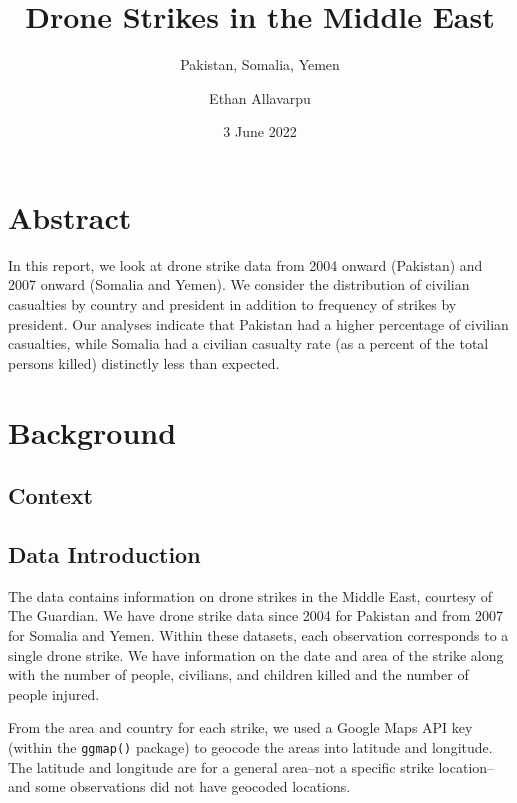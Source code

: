 \documentclass[
]{article}
\title{Drone Strikes in the Middle East}
\subtitle{Pakistan, Somalia, Yemen}
\author{Ethan Allavarpu}
\date{3 June 2022}
\begin{document}
\maketitle

{
\setcounter{tocdepth}{1}
\tableofcontents
}
\vfill

\hypertarget{abstract}{%
\section{Abstract}\label{abstract}}

In this report, we look at drone strike data from 2004 onward (Pakistan)
and 2007 onward (Somalia and Yemen). We consider the distribution of
civilian casualties by country and president in addition to frequency of
strikes by president. Our analyses indicate that Pakistan had a higher
percentage of civilian casualties, while Somalia had a civilian casualty
rate (as a percent of the total persons killed) distinctly less than
expected.

\pagebreak

\hypertarget{background}{%
\section{Background}\label{background}}

\hypertarget{context}{%
\subsection{Context}\label{context}}

\hypertarget{data-introduction}{%
\subsection{Data Introduction}\label{data-introduction}}

The data contains information on drone strikes in the Middle East,
courtesy of The Guardian. We have drone strike data since 2004 for
Pakistan and from 2007 for Somalia and Yemen. Within these datasets,
each observation corresponds to a single drone strike. We have
information on the date and area of the strike along with the number of
people, civilians, and children killed and the number of people injured.

From the area and country for each strike, we used a Google Maps API key
(within the \texttt{ggmap()} package) to geocode the areas into latitude
and longitude. The latitude and longitude are for a general area--not a
specific strike location--and some observations did not have geocoded
locations.
\end{document}
